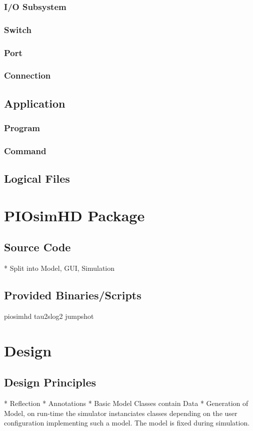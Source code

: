 \documentclass[
     11pt,         %
     a4paper,      %
     BCOR10mm,     %
     DIV14,        %
     liststotoc,   %
     bibtotoc,     %
     idxtotoc,     %
     parskip       %
     ]{scrreprt}   %
\begin{document}
\subsection{I/O Subsystem}
\subsection{Switch}
\subsection{Port}
\subsection{Connection}

\section{Application}
\subsection{Program}
\subsection{Command}

\section{Logical Files}



\chapter{PIOsimHD Package}
\section{Source Code}
* Split into Model, GUI, Simulation
\section{Provided Binaries/Scripts} %
piosimhd
tau2slog2
jumpshot




\chapter{Design}

\section{Design Principles}
* Reflection
* Annotations
* Basic Model Classes contain Data
* Generation of Model, on run-time the simulator instanciates classes depending on the user configuration implementing such a model. The model is fixed during simulation.
\end{document}
